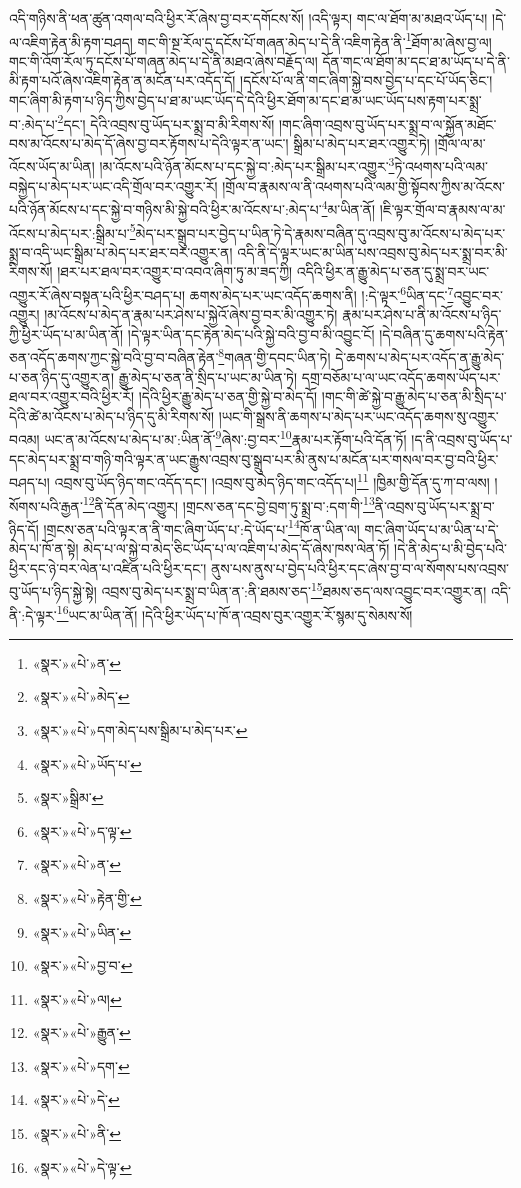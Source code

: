 འདི་གཉིས་ནི་ཕན་ཚུན་འགལ་བའི་ཕྱིར་རོ་ཞེས་བྱ་བར་དགོངས་སོ། །འདི་ལྟར། གང་ལ་ཐོག་མ་མཐའ་ཡོད་པ། །དེ་ལ་འཇིག་རྟེན་མི་རྟག་བཤད། གང་གི་སྔ་རོལ་དུ་དངོས་པོ་གཞན་མེད་པ་དེ་ནི་འཇིག་རྟེན་ནི་\footnote{«སྣར་»«པེ་»ན་}ཐོག་མ་ཞེས་བྱ་ལ། གང་གི་འོག་རོལ་ཏུ་དངོས་པོ་གཞན་མེད་པ་དེ་ནི་མཐའ་ཞེས་བརྗོད་ལ། དོན་གང་ལ་ཐོག་མ་དང་ཐ་མ་ཡོད་པ་དེ་ནི་མི་རྟག་པའོ་ཞེས་འཇིག་རྟེན་ན་མངོན་པར་འདོད་དོ། །དངོས་པོ་ལ་ནི་གང་ཞིག་སྐྱེ་བས་བྱེད་པ་དང་པོ་ཡོད་ཅིང་། གང་ཞིག་མི་རྟག་པ་ཉིད་ཀྱིས་བྱེད་པ་ཐ་མ་ཡང་ཡོད་དེ་དེའི་ཕྱིར་ཐོག་མ་དང་ཐ་མ་ཡང་ཡོད་པས་རྟག་པར་སྨྲ་བ་:མེད་པ་\footnote{«སྣར་»«པེ་»མེད་}དང་། དེའི་འབྲས་བུ་ཡོད་པར་སྨྲ་བ་མི་རིགས་སོ། །གང་ཞིག་འབྲས་བུ་ཡོད་པར་སྨྲ་བ་ལ་སྐྱོན་མཐོང་བས་མ་འོངས་པ་མེད་དོ་ཞེས་བྱ་བར་རྟོགས་པ་དེའི་ལྟར་ན་ཡང་། སྒྲིམ་པ་མེད་པར་ཐར་འགྱུར་ཏེ། །གྲོལ་ལ་མ་འོངས་ཡོད་མ་ཡིན། །མ་འོངས་པའི་ཉོན་མོངས་པ་དང་སྐྱེ་བ་:མེད་པར་སྒྲིམ་པར་འགྱུར་\footnote{«སྣར་»«པེ་»དག་མེད་པས་སྒྲིམ་པ་མེད་པར་}ཏེ་འཕགས་པའི་ལམ་བསྐྱེད་པ་མེད་པར་ཡང་འདི་གྲོལ་བར་འགྱུར་རོ། །གྲོལ་བ་རྣམས་ལ་ནི་འཕགས་པའི་ལམ་གྱི་སྟོབས་ཀྱིས་མ་འོངས་པའི་ཉོན་མོངས་པ་དང་སྐྱེ་བ་གཉིས་མི་སྐྱེ་བའི་ཕྱིར་མ་འོངས་པ་:མེད་པ་\footnote{«སྣར་»«པེ་»ཡོད་པ་}མ་ཡིན་ནོ། །ཇི་ལྟར་གྲོལ་བ་རྣམས་ལ་མ་འོངས་པ་མེད་པར་:སྒྲིམ་པ་\footnote{«སྣར་»སྒྲིམ་}མེད་པར་སྒྲུབ་པར་བྱེད་པ་ཡིན་ཏེ་དེ་རྣམས་བཞིན་དུ་འབྲས་བུ་མ་འོངས་པ་མེད་པར་སྨྲ་བ་འདི་ཡང་སྒྲིམ་པ་མེད་པར་ཐར་བར་འགྱུར་ན། འདི་ནི་དེ་ལྟར་ཡང་མ་ཡིན་པས་འབྲས་བུ་མེད་པར་སྨྲ་བར་མི་རིགས་སོ། །ཐར་པར་ཐལ་བར་འགྱུར་བ་འབའ་ཞིག་ཏུ་མ་ཟད་ཀྱི། འདིའི་ཕྱིར་ན་རྒྱུ་མེད་པ་ཅན་དུ་སྨྲ་བར་ཡང་འགྱུར་རོ་ཞེས་བསྟན་པའི་ཕྱིར་བཤད་པ། ཆགས་མེད་པར་ཡང་འདོད་ཆགས་ནི། །:དེ་ལྟར་\footnote{«སྣར་»«པེ་»ད་ལྟ་}ཡིན་དང་\footnote{«སྣར་»«པེ་»ན་}འབྱུང་བར་འགྱུར། །མ་འོངས་པ་མེད་ན་རྣམ་པར་ཤེས་པ་སྐྱེའོ་ཞེས་བྱ་བར་མི་འགྱུར་ཏེ། རྣམ་པར་ཤེས་པ་ནི་མ་འོངས་པ་ཉིད་ཀྱི་ཕྱིར་ཡོད་པ་མ་ཡིན་ནོ། །དེ་ལྟར་ཡིན་དང་རྟེན་མེད་པའི་སྐྱེ་བའི་བྱ་བ་མི་འབྱུང་ངོ། །དེ་བཞིན་དུ་ཆགས་པའི་རྟེན་ཅན་འདོད་ཆགས་ཀྱང་སྐྱེ་བའི་བྱ་བ་བཞིན་རྟེན་\footnote{«སྣར་»«པེ་»རྟེན་གྱི་}གཞན་གྱི་དབང་ཡིན་ཏེ། དེ་ཆགས་པ་མེད་པར་འདོད་ན་རྒྱུ་མེད་པ་ཅན་ཉིད་དུ་འགྱུར་ན། རྒྱུ་མེད་པ་ཅན་ནི་སྲིད་པ་ཡང་མ་ཡིན་ཏེ། དགྲ་བཅོམ་པ་ལ་ཡང་འདོད་ཆགས་ཡོད་པར་ཐལ་བར་འགྱུར་བའི་ཕྱིར་རོ། །དེའི་ཕྱིར་རྒྱུ་མེད་པ་ཅན་གྱི་སྐྱེ་བ་མེད་དོ། །གང་གི་ཚེ་སྐྱེ་བ་རྒྱུ་མེད་པ་ཅན་མི་སྲིད་པ་དེའི་ཚེ་མ་འོངས་པ་མེད་པ་ཉིད་དུ་མི་རིགས་སོ། །ཡང་གི་སྒྲས་ནི་ཆགས་པ་མེད་པར་ཡང་འདོད་ཆགས་སུ་འགྱུར་བའམ། ཡང་ན་མ་འོངས་པ་མེད་པ་མ་:ཡིན་ནོ་\footnote{«སྣར་»«པེ་»ཡིན་}ཞེས་:བྱ་བར་\footnote{«སྣར་»«པེ་»བྱ་བ་}རྣམ་པར་རྟོག་པའི་དོན་ཏོ། །ད་ནི་འབྲས་བུ་ཡོད་པ་དང་མེད་པར་སྨྲ་བ་གཉི་གའི་ལྟར་ན་ཡང་རྒྱུས་འབྲས་བུ་སྒྲུབ་པར་མི་ནུས་པ་མངོན་པར་གསལ་བར་བྱ་བའི་ཕྱིར་བཤད་པ། འབྲས་བུ་ཡོད་ཉིད་གང་འདོད་དང་། །འབྲས་བུ་མེད་ཉིད་གང་འདོད་པ།\footnote{«སྣར་»«པེ་»ལ།} །ཁྱིམ་གྱི་དོན་དུ་ཀ་བ་ལས། །སོགས་པའི་རྒྱན་\footnote{«སྣར་»«པེ་»རྒྱུན་}ནི་དོན་མེད་འགྱུར། །གྲངས་ཅན་དང་བྱེ་བྲག་ཏུ་སྨྲ་བ་:དག་གི་\footnote{«སྣར་»«པེ་»དག་}ནི་འབྲས་བུ་ཡོད་པར་སྨྲ་བ་ཉིད་དོ། །གྲངས་ཅན་པའི་ལྟར་ན་ནི་གང་ཞིག་ཡོད་པ་:དེ་ཡོད་པ་\footnote{«སྣར་»«པེ་»དེ་}ཁོ་ན་ཡིན་ལ། གང་ཞིག་ཡོད་པ་མ་ཡིན་པ་དེ་མེད་པ་ཁོ་ན་སྟེ། མེད་པ་ལ་སྐྱེ་བ་མེད་ཅིང་ཡོད་པ་ལ་འཇིག་པ་མེད་དོ་ཞེས་ཁས་ལེན་ཏོ། །དེ་ནི་མེད་པ་མི་བྱེད་པའི་ཕྱིར་དང་ཉེ་བར་ལེན་པ་འཛིན་པའི་ཕྱིར་དང་། ནུས་པས་ནུས་པ་བྱེད་པའི་ཕྱིར་དང་ཞེས་བྱ་བ་ལ་སོགས་པས་འབྲས་བུ་ཡོད་པ་ཉིད་སྐྱེ་སྟེ། འབྲས་བུ་མེད་པར་སྨྲ་བ་ཡིན་ན་:ནི་ཐམས་ཅད་\footnote{«སྣར་»«པེ་»ནི་}ཐམས་ཅད་ལས་འབྱུང་བར་འགྱུར་ན། འདི་ནི་:དེ་ལྟར་\footnote{«སྣར་»«པེ་»དེ་ལྟ་}ཡང་མ་ཡིན་ནོ། །དེའི་ཕྱིར་ཡོད་པ་ཁོ་ན་འབྲས་བུར་འགྱུར་རོ་སྙམ་དུ་སེམས་སོ། 
